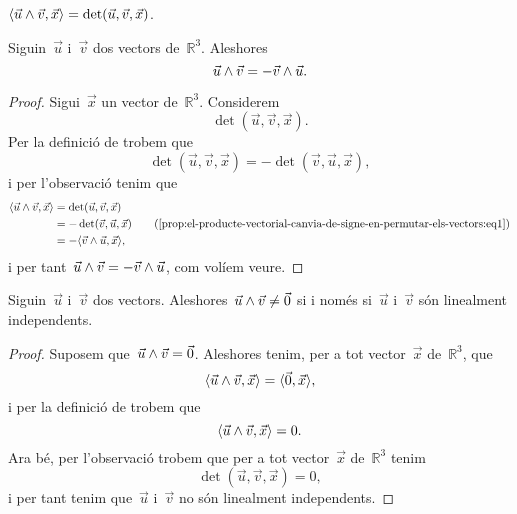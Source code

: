 \documentclass[../../main.tex]{subfiles}
\begin{document}
    \begin{observation}
        \label{obs:formula-del-determinant-segons-el-producte-vectorial-i-el-producte-escalar}
        \(\prodesc{\vec{u}\prodvec\vec{v}}{\vec{x}}=\det(\vec{u},\vec{v},\vec{x})\).
    \end{observation}
    \begin{proposition}
    \label{prop:el-producte-vectorial-canvia-de-signe-en-permutar-els-vectors}
        Siguin~\(\vec{u}\) i~\(\vec{v}\) dos vectors de~\(\mathbb{R}^{3}\).
        Aleshores
        \[
            \vec{u}\mathbin{\wedge}\vec{v}=-\vec{v}\mathbin{\wedge}\vec{u}.
        \]
    \end{proposition}
    \begin{proof}
        Sigui~\(\vec{x}\) un vector de~\(\mathbb{R}^{3}\).
        Considerem
        \[
            \det(\vec{u},\vec{v},\vec{x}).
        \]
        Per la definició de  trobem que %
        \begin{equation}
            \label{prop:el-producte-vectorial-canvia-de-signe-en-permutar-els-vectors:eq1}
            \det(\vec{u},\vec{v},\vec{x})=-\det(\vec{v},\vec{u},\vec{x}),
        \end{equation}
        i per l'observació  tenim que
        \begin{align*}
            \prodesc{\vec{u}\prodvec\vec{v}}{\vec{x}}&=\det(\vec{u},\vec{v},\vec{x}) \\
            &=-\det(\vec{v},\vec{u},\vec{x}) \tag{\ref{prop:el-producte-vectorial-canvia-de-signe-en-permutar-els-vectors:eq1}}\\
            &=-\prodesc{\vec{v}\prodvec\vec{u}}{\vec{x}},
        \end{align*}
        i per tant~\(\vec{u}\mathbin{\wedge}\vec{v}=-\vec{v}\mathbin{\wedge}\vec{u}\), com volíem veure.
    \end{proof}
    \begin{proposition}
        \label{prop:el-producte-vectorial-es-zero-si-i-nomes-si-els-vectors-no-son-linealment-independents}
        Siguin~\(\vec{u}\) i~\(\vec{v}\) dos vectors.
        Aleshores~\(\vec{u}\mathbin{\wedge}\vec{v}\neq\vec{0}\) si i només si~\(\vec{u}\) i~\(\vec{v}\) són linealment independents.
    \end{proposition}
    \begin{proof}
        Suposem que~\(\vec{u}\mathbin{\wedge}\vec{v}=\vec{0}\).
        Aleshores tenim, per a tot vector~\(\vec{x}\) de~\(\mathbb{R}^{3}\), que
        \[
            \prodesc{\vec{u}\prodvec\vec{v}}{\vec{x}}=\prodesc{\vec{0}}{\vec{x}},
        \]
        i per la definició de  trobem que
        \[
            \prodesc{\vec{u}\prodvec\vec{v}}{\vec{x}}=0.
        \]
        Ara bé, per l'observació  trobem que per a tot vector~\(\vec{x}\) de~\(\mathbb{R}^{3}\) tenim
        \[
            \det(\vec{u},\vec{v},\vec{x})=0,
        \]
        i per tant tenim que~\(\vec{u}\) i~\(\vec{v}\) no són linealment independents.
    \end{proof}
\end{document}
